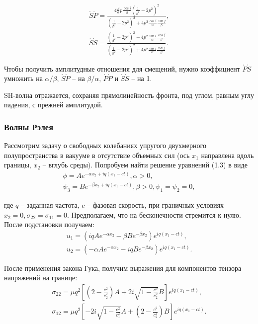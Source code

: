 \begin{eqnarray}
\acute{S}\grave{P} = \frac{ 4\frac{\beta}{\alpha}p\frac{\cos{j}}{\beta}(\frac{1}{\beta^2} - 2p^2)^2 }{ (\frac{1}{\beta^2} - 2p^2)^2 + 4p^2\frac{\cos{i}}{\alpha}\frac{\cos{j}}{\beta} }, \nonumber\\
\acute{S}\grave{S} = \frac{ (\frac{1}{\beta^2} - 2p^2)^2 - 4p^2\frac{\cos{i}}{\alpha}\frac{\cos{j}}{\beta} }{ (\frac{1}{\beta^2} - 2p^2)^2 + 4p^2\frac{\cos{i}}{\alpha}\frac{\cos{j}}{\beta} }.
\end{eqnarray}

Чтобы получить амплитудные отношения для смещений, нужно коэффициент $\acute{P}\grave{S}$ умножить на $\alpha/\beta$, $\acute{S}\grave{P}$ -- на $\beta/\alpha$, $\acute{P}\grave{P}$ и $\acute{S}\grave{S}$ -- на 1.

SH-волна отражается, сохраняя прямолинейность фронта, под углом, равным углу падения, с прежней амплитудой.


\subsubsection{Волны Рэлея}

Рассмотрим задачу о свободных колебаниях упругого двухмерного полупространства в вакууме в отсутствие объемных сил (ось $x_1$ направлена вдоль границы, $x_2$ -- вглубь среды). Попробуем найти решение уравнений (1.3) в виде
\begin{eqnarray}
\phi = Ae^{-\alpha x_2 + iq(x_1-ct)}, \alpha > 0, \nonumber\\
\psi_3 = Be^{-\beta x_2 + iq(x_1-ct)}, \beta > 0, \psi_1 = \psi_2 = 0,
\end{eqnarray}

где $q$ -- заданная частота, $c$ -- фазовая скорость, при граничных условиях $x_2 = 0, \sigma_{22} = \sigma_{11} = 0$. Предполагаем, что на бесконечности стремится к нулю. После подстановки получаем:
\begin{eqnarray}
u_1 = (iq Ae^{-\alpha x_2} - \beta Be^{-\beta x_2}) e^{iq(x_1-ct)}, \nonumber\\
u_2 = (-\alpha Ae^{-\alpha x_2} - iq Be^{-\beta x_2}) e^{iq(x_1-ct)}.
\end{eqnarray}

После применения закона Гука, получим выражения для компонентов тензора напряжений на границе:
\begin{eqnarray}
\sigma_{22} = \mu q^2 [ (2-\frac{c^2}{c_2^2})A + 2i\sqrt{1-\frac{c^2}{c_2^2}}B ] e^{iq(x_1-ct)}, \nonumber\\
\sigma_{12} = \mu q^2 [ -2i\sqrt{1-\frac{c^2}{c_1^2}}A + (2-\frac{c^2}{c_2^2})B ] e^{iq(x_1-ct)}.
\end{eqnarray}


